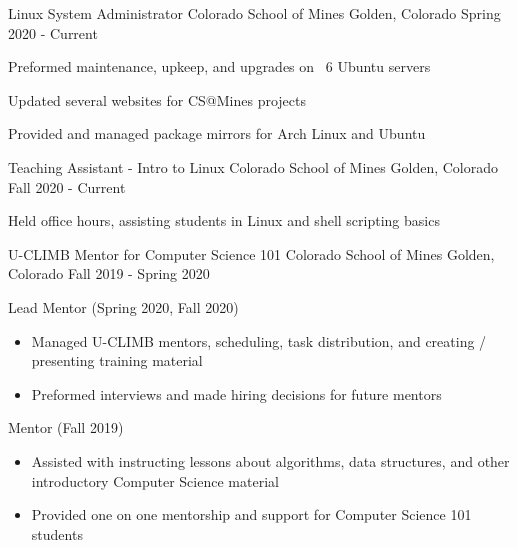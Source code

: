 \begin{cventries}
    \cventry
    {Linux System Administrator}
    {Colorado School of Mines}
    {Golden, Colorado}
    {Spring 2020 - Current}
    {
        \begin{cvitems}
        \item Preformed maintenance, upkeep, and upgrades on ~6 Ubuntu servers
        \item Updated several websites for CS@Mines projects
        \item Provided and managed package mirrors for Arch Linux and Ubuntu
        \end{cvitems}
    }

    \cventry
    {Teaching Assistant - Intro to Linux}
    {Colorado School of Mines}
    {Golden, Colorado}
    {Fall 2020 - Current}
    {
        \begin{cvitems}
        \item Held office hours, assisting students in Linux and shell scripting basics
        \end{cvitems}
    }


    \cventry
    	{U-CLIMB Mentor for Computer Science 101}
    	{ Colorado School of Mines }
    	{ Golden, Colorado}
	   	 {Fall 2019 - Spring 2020}
   	 {
   	 \begin{cvitems}
         \item {Lead Mentor (Spring 2020, Fall 2020)}
         \begin{itemize}
         \item {Managed U-CLIMB mentors, scheduling, task
    	distribution, and creating /
      presenting training material}
          \item {Preformed interviews and made hiring decisions for future mentors}
         \end{itemize}
         \ifcv
         \item {Mentor (Fall 2019)}
         \begin{itemize}
            	 \item {Assisted with instructing lessons about algorithms, data structures, and other introductory Computer Science material}
   	         \item {Provided one on one mentorship and support for
    	Computer Science 101 students}
        \end{itemize}
        \fi
      \end{cvitems}
      }


\end{cventries}
